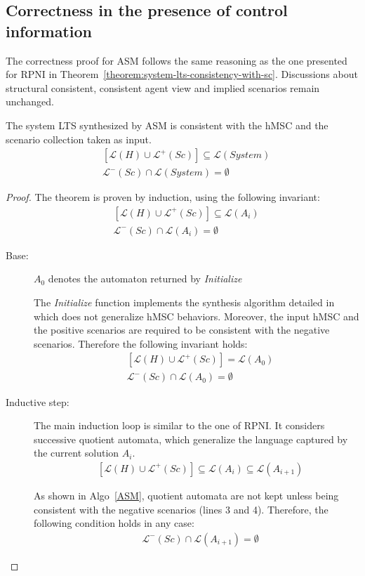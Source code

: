 
\subsection{Correctness in the presence of control information\label{subsection:correctness-of-asm}}

The correctness proof for ASM follows the same reasoning as the one presented for RPNI in Theorem~\ref{theorem:system-lts-consistency-with-sc}. Discussions about structural consistent, consistent agent view and implied scenarios remain unchanged. 

\begin{theorem}
The system LTS synthesized by ASM is consistent with the hMSC and the scenario collection taken as input.
\begin{align*}
&[\mathcal{L}(H)   \cup \mathcal{L}^+(Sc)] \subseteq \mathcal{L}(System)\\
&\mathcal{L}^-(Sc) \cap \mathcal{L}(System) = \emptyset
\end{align*}
\begin{proof}
The theorem is proven by induction, using the following invariant:
\begin{align*}
&[\mathcal{L}(H) \cup \mathcal{L}^+(Sc)] \subseteq \mathcal{L}(A_i)\\
&\mathcal{L}^-(Sc) \cap \mathcal{L}(A_i) = \emptyset
\end{align*}

\begin{description}
\item[Base:] $A_0$ denotes the automaton returned by \emph{Initialize}

The \emph{Initialize} function implements the synthesis algorithm detailed in \cite{Uchitel:2003} which does not generalize hMSC behaviors. Moreover, the input hMSC and the positive scenarios are required to be consistent with the negative scenarios. Therefore the following invariant holds:
\begin{align*}
&[\mathcal{L}(H) \cup \mathcal{L}^+(Sc)] = \mathcal{L}(A_0)\\
&\mathcal{L}^-(Sc) \cap \mathcal{L}(A_0) = \emptyset
\end{align*}

\item[Inductive step:]
The main induction loop is similar to the one of RPNI. It considers successive quotient automata, which generalize the language captured by the current solution $A_i$.
\begin{align*}
&[\mathcal{L}(H) \cup \mathcal{L}^+(Sc)] \subseteq \mathcal{L}(A_i) \subseteq \mathcal{L}(A_{i+1})
\end{align*}

As shown in Algo~\ref{ASM}, quotient automata are not kept unless being consistent with the negative scenarios (lines 3 and 4). Therefore, the following condition holds in any case:
\begin{align*}
&\mathcal{L}^-(Sc) \cap \mathcal{L}(A_{i+1}) = \emptyset
\end{align*}

\end{description}
\end{proof}
\end{theorem}

